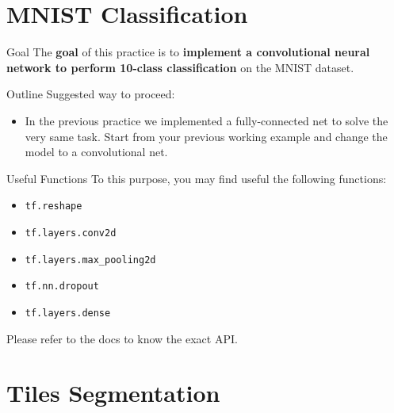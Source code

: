 \documentclass[aspectratio=169]{beamer}
\begin{document}
\section{MNIST Classification}


\begin{frame}{Goal}
The \textbf{goal} of this practice is to \textbf{implement a convolutional neural network to perform 10-class classification} on the MNIST dataset.
\end{frame}


\begin{frame}{Outline}
Suggested way to proceed:
\begin{itemize}
\item In the previous practice we implemented a fully-connected net to solve the very same task. Start from your previous working example and change the model to a convolutional net.
\end{itemize}
\end{frame}


\begin{frame}{Useful Functions}
To this purpose, you may find useful the following functions:
\begin{itemize}
\item \texttt{tf.reshape}
\item \texttt{tf.layers.conv2d}
\item \texttt{tf.layers.max\_pooling2d}
\item \texttt{tf.nn.dropout}
\item \texttt{tf.layers.dense}
\end{itemize}
Please refer to the docs to know the exact API.
\end{frame}


\section{Tiles Segmentation}
\end{document}
